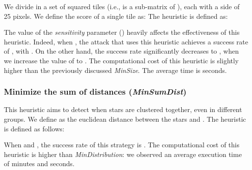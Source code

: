 \documentclass[conference]{IEEEtran}
\begin{document}
We divide  in a set  of  squared tiles (i.e.,  is a sub-matrix of ), each with a side of 25 pixels.
We define the score of a single tile  as:
 The heuristic is defined as:

The value of the \textit{sensitivity} parameter () heavily affects the effectiveness of this heuristic.
Indeed, when , the attack that uses this heuristic achieves a success rate of , with .
On the other hand, the success rate significantly decreases to , when we increase the value of  to . The computational cost of this heuristic is slightly higher than the previously discussed \textit{MinSize}.
The average time is  seconds. 


\begin{comment}
\subsection{Maximize the number of drawn stars (\textit{MaxDrawn})}
During the drawing process, some stars can be placed outside the drawable area.
Not surprisingly, a state that represents a valid solution has a high probability of having a lower number of pixels outside the drawable area than invalid states.
This happens with a  probability with , and decrease as  rise.
We define with  the set of pixels outside the drawable area.
We search the states with the lowest , and then apply the previously defined .
In Figure~\ref{fig:allattacksONsens}, we compare the success rate of the heuristics on the variation of \textit{sensitivity} ().
Increase  raise the success rate of MaxDrawn, but drops down the effectiveness of MinDistribution.
The execution time of this strategy is average  seconds.
This is not far from the cost of MinDistribution, since the count of pixels off-screen is a very cheap task.
\end{comment}

\subsubsection{Minimize the sum of distances (\textit{MinSumDist})}
This heuristic aims to detect when stars are clustered together, even in different groups. We define  as the euclidean distance between the stars  and .
The heuristic is defined as follows:

When  and , the success rate of this strategy is .
The computational cost of this heuristic is higher than \textit{MinDistribution}:
we observed an average execution time of  minutes and  seconds.
\end{document}
